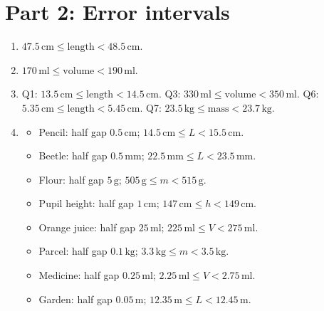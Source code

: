 \documentclass[11pt,a4paper]{article}
\begin{document}
\section*{Part 2: Error intervals}
\begin{enumerate}[label=\textbf{Q\arabic*.}, start=9, leftmargin=*, itemsep=2pt]
\item \(47.5\,\text{cm}\le \text{length}<48.5\,\text{cm}\).
\item \(170\,\text{ml}\le \text{volume}<190\,\text{ml}\).
\item Q1: \(13.5\,\text{cm}\le \text{length}<14.5\,\text{cm}\). Q3: \(330\,\text{ml}\le \text{volume}<350\,\text{ml}\). Q6: \(5.35\,\text{cm}\le \text{length}<5.45\,\text{cm}\). Q7: \(23.5\,\text{kg}\le \text{mass}<23.7\,\text{kg}\).
\item
\begin{itemize}[leftmargin=*, itemsep=2pt]
\item Pencil: half gap \(0.5\,\text{cm}\); \(14.5\,\text{cm}\le L<15.5\,\text{cm}\).
\item Beetle: half gap \(0.5\,\text{mm}\); \(22.5\,\text{mm}\le L<23.5\,\text{mm}\).
\item Flour: half gap \(5\,\text{g}\); \(505\,\text{g}\le m<515\,\text{g}\).
\item Pupil height: half gap \(1\,\text{cm}\); \(147\,\text{cm}\le h<149\,\text{cm}\).
\item Orange juice: half gap \(25\,\text{ml}\); \(225\,\text{ml}\le V<275\,\text{ml}\).
\item Parcel: half gap \(0.1\,\text{kg}\); \(3.3\,\text{kg}\le m<3.5\,\text{kg}\).
\item Medicine: half gap \(0.25\,\text{ml}\); \(2.25\,\text{ml}\le V<2.75\,\text{ml}\).
\item Garden: half gap \(0.05\,\text{m}\); \(12.35\,\text{m}\le L<12.45\,\text{m}\).
\end{itemize}
\end{enumerate}
\end{document}
